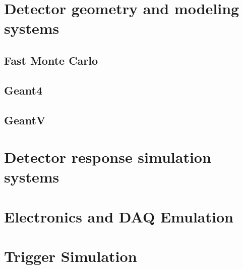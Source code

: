 \section{Detector geometry and modeling systems}

\subsection{Fast Monte Carlo}

\subsection{Geant4}

\subsection{GeantV}

\section{Detector response simulation systems}

\section{Electronics and DAQ Emulation}

\section{Trigger Simulation}
